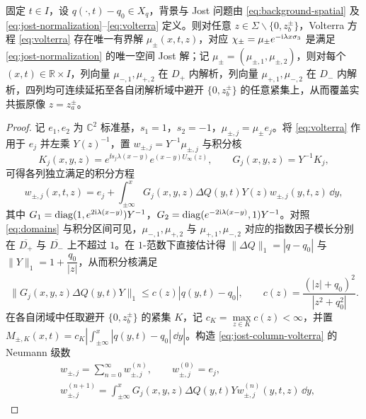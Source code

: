 \begin{theorem}\label{thm:jost}
固定 $t\in I$，设 $q(\cdot,t)-q_0\in X_q$，背景与 Jost 问题由 \eqref{eq:background-spatial} 及 \eqref{eq:jost-normalization}--\eqref{eq:volterra} 定义。则对任意 $z\in\Sigma\mathbin{\backslash}\{0,z_b^\pm\}$，Volterra 方程 \eqref{eq:volterra} 存在唯一有界解 $\mu_\pm(x,t,z)$，对应 $\chi_\pm=\mu_\pm e^{-\mathrm{i}\lambda x\sigma_3}$ 是满足 \eqref{eq:jost-normalization} 的唯一空间 Jost 解；记 $\mu_\pm=(\mu_{\pm,1},\mu_{\pm,2})$，则对每个 $(x,t)\in\mathbb R\times I$，列向量 $\mu_{-,1},\mu_{+,2}$ 在 $D_+$ 内解析，列向量 $\mu_{+,1},\mu_{-,2}$ 在 $D_-$ 内解析，四列均可连续延拓至各自闭解析域中避开 $\{0,z_b^\pm\}$ 的任意紧集上，从而覆盖实共振原像 $z=z_a^\pm$。
\end{theorem}
\begin{proof}
记 $e_1,e_2$ 为 $\mathbb C^2$ 标准基，$s_1=1$，$s_2=-1$，$\mu_{\pm,j}=\mu_\pm e_j$。将 \eqref{eq:volterra} 作用于 $e_j$ 并左乘 $Y(z)^{-1}$，置 $w_{\pm,j}=Y^{-1}\mu_{\pm,j}$ 与积分核
\begin{equation}\label{eq:columnkernel}
K_j(x,y,z)=e^{\ii s_j\lambda(x-y)}e^{(x-y)U_\infty(z)},\qquad
G_j(x,y,z)=Y^{-1}K_j,
\end{equation}
可得各列独立满足的积分方程
\begin{equation}\label{eq:jost-column-volterra}
w_{\pm,j}(x,t,z)=e_j+\int_{\pm\infty}^{x}
G_j(x,y,z)\Delta Q(y,t)Y(z)w_{\pm,j}(y,t,z)\,\dd y,
\end{equation}
其中 $G_1=\operatorname{diag}(1,e^{2\mathrm{i}\lambda(x-y)})Y^{-1}$，$G_2=\operatorname{diag}(e^{-2\mathrm{i}\lambda(x-y)},1)Y^{-1}$。对照 \eqref{eq:domains} 与积分区间可见，$\mu_{-,1},\mu_{+,2}$ 与 $\mu_{+,1},\mu_{-,2}$ 对应的指数因子模长分别在 $\overline{D_+}$ 与 $\overline{D_-}$ 上不超过 $1$。在 $1$-范数下直接估计得 $\|\Delta Q\|_1=|q-q_0|$ 与 $\|Y\|_1=1+\dfrac{q_0}{|z|}$，从而积分核满足
\begin{equation}\label{eq:jost-kernel-estimate}
\|G_j(x,y,z)\Delta Q(y,t)Y\|_1
\le c(z)|q(y,t)-q_0|,\qquad
c(z)=\dfrac{(|z|+q_0)^2}{|z^2+q_0^2|}.
\end{equation}
在各自闭域中任取避开 $\{0,z_b^\pm\}$ 的紧集 $K$，记 $c_K=\displaystyle\max\limits_{z\in K}c(z)<\infty$，并置 $M_{\pm,K}(x,t)=c_K\left|\int_{\pm\infty}^{x}|q(y,t)-q_0|\,\dd y\right|$。构造 \eqref{eq:jost-column-volterra} 的 Neumann 级数
\begin{equation}\label{eq:jost-neumann}
\begin{aligned}
&w_{\pm,j}=\sum\limits_{n=0}^{\infty}w_{\pm,j}^{(n)},\qquad w_{\pm,j}^{(0)}=e_j,\\
&w_{\pm,j}^{(n+1)}=\int_{\pm\infty}^{x}G_j(x,y,z)\Delta Q(y,t)Yw_{\pm,j}^{(n)}(y,t,z)\,\dd y,

\end{aligned}
\end{equation}
\end{proof}
